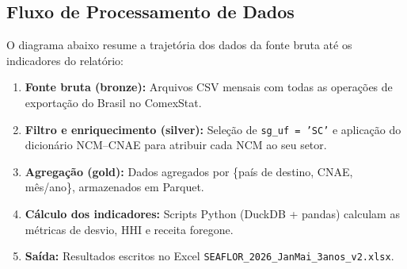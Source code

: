 \documentclass[12pt, a4paper]{article}
\begin{document}
\subsection{Fluxo de Processamento de Dados}

O diagrama abaixo resume a trajetória dos dados da fonte bruta até os
indicadores do relatório:

\vspace{1em}
\begin{center}
\end{center}
\vspace{0.5em}

\begin{enumerate}
  \item \textbf{Fonte bruta (bronze):} Arquivos CSV mensais com todas as operações
    de exportação do Brasil no ComexStat.
  \item \textbf{Filtro e enriquecimento (silver):} Seleção de \texttt{sg\_uf = 'SC'}
    e aplicação do dicionário NCM--CNAE para atribuir cada NCM ao seu setor.
  \item \textbf{Agregação (gold):} Dados agregados por
    \{país de destino, CNAE, mês/ano\}, armazenados em Parquet.
  \item \textbf{Cálculo dos indicadores:} Scripts Python (DuckDB + pandas)
    calculam as métricas de desvio, HHI e receita foregone.
  \item \textbf{Saída:} Resultados escritos no Excel
    \texttt{SEAFLOR\_2026\_JanMai\_3anos\_v2.xlsx}.
\end{enumerate}
\end{document}
